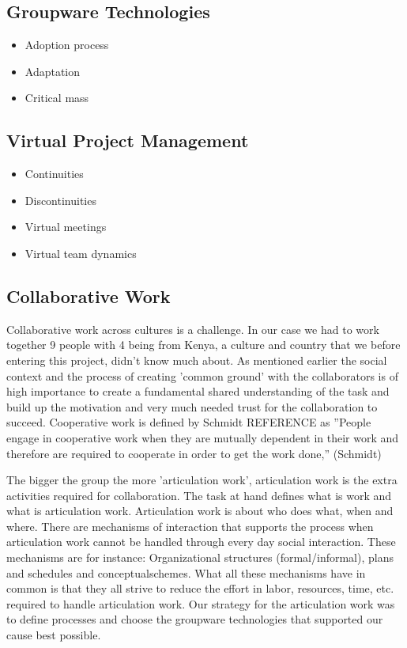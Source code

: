 \subsection{Groupware Technologies}
\begin{itemize}
  \item Adoption process
  \item Adaptation
  \item Critical mass
\end{itemize}

\subsection{Virtual Project Management}
\begin{itemize}
  \item Continuities
  \item Discontinuities
  \item Virtual meetings
	\item Virtual team dynamics
\end{itemize}


\subsection{Collaborative Work}

Collaborative work across cultures is a challenge. In our case we had to work together 9 people with 4 being from Kenya, a culture and country that we before entering this project, didn't know much about. As mentioned earlier the social context and the process of creating 'common ground' with the collaborators is of high importance to create a fundamental shared understanding of the task and build up the motivation and very much needed trust for the collaboration to succeed. Cooperative work is defined by Schmidt REFERENCE as ''People engage in cooperative work when they are mutually dependent in their work and therefore are required to cooperate in order to get the work done,'' (Schmidt)

The bigger the group the more 'articulation work', articulation work is the extra activities required for collaboration. The task at hand defines what is work and what is articulation work. Articulation work is about who does what, when and where. There are mechanisms of interaction that supports the process when articulation work cannot be handled through every day social interaction. These mechanisms are for instance: Organizational structures (formal/informal), plans and schedules and conceptualschemes. What all these mechanisms have in common is that they all strive to reduce the effort in labor, resources, time, etc. required to handle articulation work. 
Our strategy for the articulation work was to define processes and choose the groupware technologies that supported our cause best possible. 


